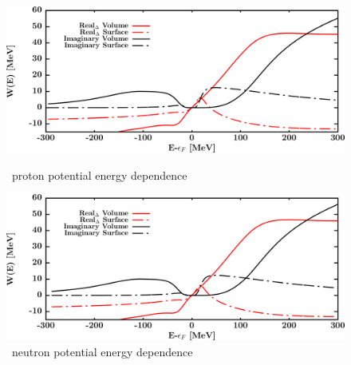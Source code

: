 \begin{figure}[hbtp]
    \centering
    \begin{minipage}{0.42\textwidth}
        \centering
        \includegraphics[width=\textwidth]{figures/ca40_protonPotentials.png}
        \caption*{\footnotesize\caForty\ proton potential energy dependence}
        \label{DOMFitData_ca40_proton_potentialComponent_energy}
    \end{minipage}\hspace{6pt}
    \begin{minipage}{0.42\textwidth}
        \centering
        \includegraphics[width=\textwidth]{figures/ca40_neutronPotentials.png}
        \caption*{\footnotesize\caForty\ neutron potential energy dependence}
        \label{DOMFitData_ca40_neutron_potentialComponent_energy}
    \end{minipage}
\end{figure}

